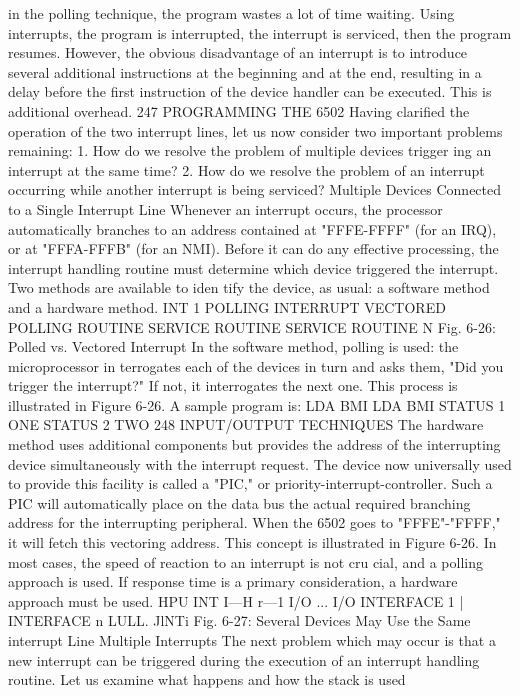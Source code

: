 \documentclass{book}
\begin{document}
in the polling technique, the program wastes a lot of time waiting.
Using interrupts, the program is interrupted, the interrupt is serviced,
then the program resumes. However, the obvious disadvantage of an
interrupt is to introduce several additional instructions at the beginning
and at the end, resulting in a delay before the first instruction of the
device handler can be executed. This is additional overhead.
247
PROGRAMMING THE 6502
Having clarified the operation of the two interrupt lines, let us
now consider two important problems remaining:
1. How do we resolve the problem of multiple devices trigger
ing an interrupt at the same time?
2. How do we resolve the problem of an interrupt occurring
while another interrupt is being serviced?
Multiple Devices Connected to a Single Interrupt Line
Whenever an interrupt occurs, the processor automatically
branches to an address contained at "FFFE-FFFF" (for an IRQ),
or at "FFFA-FFFB" (for an NMI). Before it can do any effective
processing, the interrupt handling routine must determine which
device triggered the interrupt. Two methods are available to iden
tify the device, as usual: a software method and a hardware
method.
INT 1 POLLING INTERRUPT VECTORED
POLLING
ROUTINE
SERVICE
ROUTINE
SERVICE
ROUTINE N
Fig. 6-26: Polled vs. Vectored Interrupt
In the software method, polling is used: the microprocessor in
terrogates each of the devices in turn and asks them, "Did you
trigger the interrupt?" If not, it interrogates the next one. This
process is illustrated in Figure 6-26. A sample program is:
LDA
BMI
LDA
BMI
STATUS 1
ONE
STATUS 2
TWO
248
INPUT/OUTPUT TECHNIQUES
The hardware method uses additional components but provides
the address of the interrupting device simultaneously with the
interrupt request. The device now universally used to provide this
facility is called a "PIC," or priority-interrupt-controller. Such a
PIC will automatically place on the data bus the actual required
branching address for the interrupting peripheral. When the
6502 goes to "FFFE"-"FFFF," it will fetch this vectoring address.
This concept is illustrated in Figure 6-26.
In most cases, the speed of reaction to an interrupt is not cru
cial, and a polling approach is used. If response time is a primary
consideration, a hardware approach must be used.
HPU
INT
I—H r—1
I/O ... I/O
INTERFACE 1 | INTERFACE n
LULL. JlNTi
Fig. 6-27: Several Devices May Use the Same interrupt Line
Multiple Interrupts
The next problem which may occur is that a new interrupt can
be triggered during the execution of an interrupt handling
routine. Let us examine what happens and how the stack is used
\end{document}
